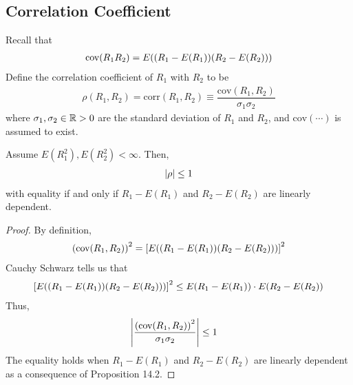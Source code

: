 \subsection{Correlation Coefficient}
\begin{definition}
    Recall that
    \begin{align}
        \text{cov}(R_1R_2) = E\qty((R_1 - E(R_1))(R_2 - E(R_2)))
    \end{align}
    Define the correlation coefficient of $R_1$ with $R_2$ to be
    \begin{align}
        \rho(R_1,R_2) = \text{corr}(R_1,R_2) \equiv \dfrac{\text{cov}(R_1,R_2)}{\sigma_1\sigma_2}
    \end{align}
    where $\sigma_1,\sigma_2 \in \mathbb{R} > 0$ are the standard deviation of $R_1$ and $R_2$, and $\text{cov}(\cdots)$ is assumed to exist.
\end{definition}

\begin{proposition}
    Assume $E(R_1^2),E(R_2^2) < \infty$. Then,
    \begin{align}
        \abs{\rho} \le 1
    \end{align}
    with equality if and only if $R_1 - E(R_1)$ and $R_2 - E(R_2)$ are linearly dependent.
\end{proposition}
\begin{proof}
    By definition,
    \begin{align}
        \qty(\text{cov}(R_1,R_2))^2 = \qty[E\qty((R_1 - E(R_1))(R_2 - E(R_2)))]^2
    \end{align}
    Cauchy Schwarz tells us that
    \begin{align*}
        \qty[E\qty((R_1 - E(R_1))(R_2 - E(R_2)))]^2 \le E\qty(R_1 - E(R_1)) \cdot E\qty(R_2 - E(R_2))
    \end{align*}
    Thus,
    \begin{align}
        \abs{\dfrac{\qty(\text{cov}(R_1,R_2))^2}{\sigma_1\sigma_2}} \le 1 & \qedhere
    \end{align}
    The equality holds when $R_1 - E(R_1)$ and $R_2 - E(R_2)$ are linearly dependent as a consequence of Proposition 14.2.
\end{proof}
    
